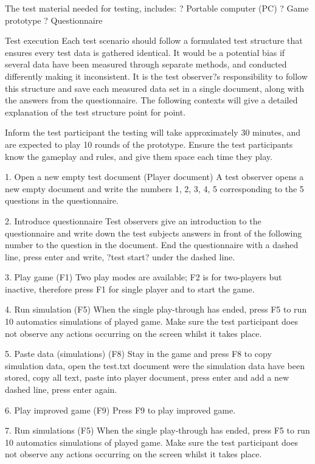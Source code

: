 The test material needed for testing, includes:
?	Portable computer (PC)
?	Game prototype
?	Questionnaire

Test execution
Each test scenario should follow a formulated test structure that ensures every test data is gathered identical. It would be a potential bias if several data have been measured through separate methods, and conducted differently making it inconsistent. It is the test observer?s responsibility to follow this structure and save each measured data set in a single document, along with the answers from the questionnaire.
The following contexts will give a detailed explanation of the test structure point for point.

Inform the test participant the testing will take approximately 30 minutes, and are expected to play 10 rounds of the prototype. Ensure the test participants know the gameplay and rules, and give them space each time they play.

1.	Open a new empty test document (Player document)
A test observer opens a new empty document and write the numbers 1, 2, 3, 4, 5 corresponding to the 5 questions in the questionnaire.

2.	Introduce questionnaire
Test observers give an introduction to the questionnaire and write down the test subjects answers in front of the following number to the question in the document.
End the questionnaire with a dashed line, press enter and write, ?test start? under the dashed line.

3.	Play game (F1)
Two play modes are available; F2 is for two-players but inactive, therefore press F1 for single player and to start the game.

4.	Run simulation (F5)
When the single play-through has ended, press F5 to run 10 automatics simulations of played game. Make sure the test participant does not observe any actions occurring on the screen whilst it takes place.

5.	Paste data (simulations) (F8)
Stay in the game and press F8 to copy simulation data, open the test.txt document were the simulation data have been stored, copy all text, paste into player document, press enter and add a new dashed line, press enter again.

6.	Play improved game (F9)
Press F9 to play improved game.

7.	Run simulations (F5)
When the single play-through has ended, press F5 to run 10 automatics simulations of played game. Make sure the test participant does not observe any actions occurring on the screen whilst it takes place.

